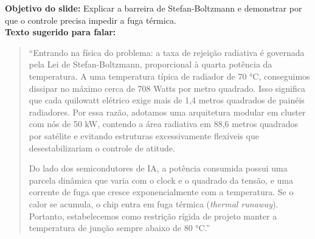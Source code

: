 \documentclass[11pt,a4paper]{article}
\begin{document}
\begin{tcolorbox}[colback=speechbg, colframe=bordergreen, title=\color{ifesdark}\textbf{SLIDE 4: FÍSICA DA DISSIPAÇÃO NO VÁCUO E O LIMITE DOS CHIPS \hfill TEMPO: 3:00 -- 4:15 (Duração: 75 segundos)}]
\small
\textbf{Objetivo do slide:} Explicar a barreira de Stefan-Boltzmann e demonstrar por que o controle precisa impedir a fuga térmica.\\
\textbf{Texto sugerido para falar:}
\begin{quote}
``Entrando na física do problema: a taxa de rejeição radiativa é governada pela Lei de Stefan-Boltzmann, proporcional à quarta potência da temperatura. A uma temperatura típica de radiador de 70 °C, conseguimos dissipar no máximo cerca de 708 Watts por metro quadrado. Isso significa que cada quilowatt elétrico exige mais de 1,4 metros quadrados de painéis radiadores. Por essa razão, adotamos uma arquitetura modular em cluster com nós de 50 kW, contendo a área radiativa em 88,6 metros quadrados por satélite e evitando estruturas excessivamente flexíveis que desestabilizariam o controle de atitude.

Do lado dos semicondutores de IA, a potência consumida possui uma parcela dinâmica que varia com o clock e o quadrado da tensão, e uma corrente de fuga que cresce exponencialmente com a temperatura. Se o calor se acumula, o chip entra em fuga térmica (\textit{thermal runaway}). Portanto, estabelecemos como restrição rígida de projeto manter a temperatura de junção sempre abaixo de 80 °C.''
\end{quote}
\end{tcolorbox}

\vspace{6pt}
\end{document}
